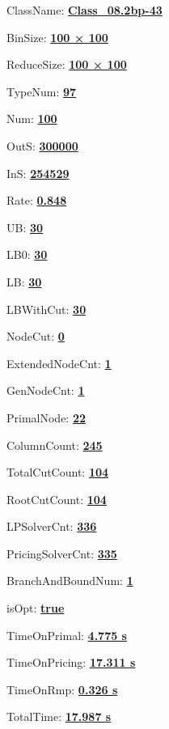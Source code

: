 \documentclass[11pt]{article}
\begin{document}
\pagestyle{empty}


ClassName: \underline{\textbf{Class_08.2bp-43}}
\par
BinSize: \underline{\textbf{100 × 100}}
\par
ReduceSize: \underline{\textbf{100 × 100}}
\par
TypeNum: \underline{\textbf{97}}
\par
Num: \underline{\textbf{100}}
\par
OutS: \underline{\textbf{300000}}
\par
InS: \underline{\textbf{254529}}
\par
Rate: \underline{\textbf{0.848}}
\par
UB: \underline{\textbf{30}}
\par
LB0: \underline{\textbf{30}}
\par
LB: \underline{\textbf{30}}
\par
LBWithCut: \underline{\textbf{30}}
\par
NodeCut: \underline{\textbf{0}}
\par
ExtendedNodeCnt: \underline{\textbf{1}}
\par
GenNodeCnt: \underline{\textbf{1}}
\par
PrimalNode: \underline{\textbf{22}}
\par
ColumnCount: \underline{\textbf{245}}
\par
TotalCutCount: \underline{\textbf{104}}
\par
RootCutCount: \underline{\textbf{104}}
\par
LPSolverCnt: \underline{\textbf{336}}
\par
PricingSolverCnt: \underline{\textbf{335}}
\par
BranchAndBoundNum: \underline{\textbf{1}}
\par
isOpt: \underline{\textbf{true}}
\par
TimeOnPrimal: \underline{\textbf{4.775 s}}
\par
TimeOnPricing: \underline{\textbf{17.311 s}}
\par
TimeOnRmp: \underline{\textbf{0.326 s}}
\par
TotalTime: \underline{\textbf{17.987 s}}
\par
\newpage


\end{document}
